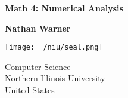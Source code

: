 \documentclass{report}
\title{\Huge{}}
\author{\huge{Nathan Warner}}
\date{\huge{}}
\begin{document}
        \begin{titlepage}
       \begin{center}
           \vspace*{1cm}
    
           \textbf{Math 4: Numerical Analysis}
    
           \vspace{0.5cm}
            
                
           \vspace{1.5cm}
    
           \textbf{Nathan Warner}
    
           \vfill
                
                
           \vspace{0.8cm}
         
           \texttt{[image: ~/niu/seal.png]}
                
           Computer Science \\
           Northern Illinois University\\
           United States\\
           
                
       \end{center}
    \end{titlepage}
    \tableofcontents

    \pagebreak 
\end{document}
